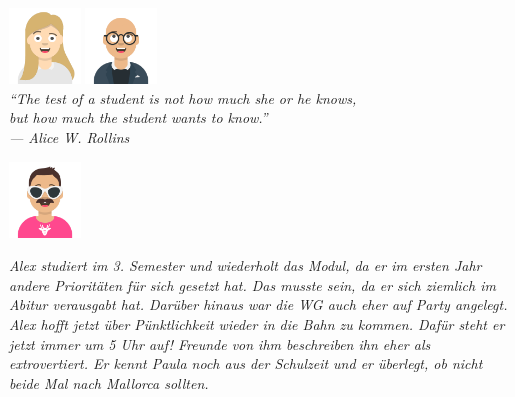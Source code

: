 \documentclass[a4paper, 9pt]{scrartcl}\usepackage[]{graphicx}\usepackage[]{xcolor}
\begin{document}
{\begin{center}
\includegraphics[width = 1.9cm]{avatare/Tina}\hspace{-8mm}
\includegraphics[width = 1.9cm]{avatare/Yuki}\\
\small
\vspace{1.5Ex}
\textit{"`The test of a student is not how much she or he knows,\\ but how much the student wants to know."'\\ --- Alice W. Rollins}
\end{center}}
\maketitle
{}
\thispagestyle{empty}
\clearpage
\begin{minipage}[c]{0.125\textwidth}
\includegraphics[width = 1.9cm]{avatare/Alex}
\end{minipage}
\begin{minipage}[c]{0.875\textwidth}
\textit{Alex studiert im 3. Semester und wiederholt das Modul, da er im ersten Jahr andere Prioritäten für sich gesetzt hat. Das musste sein, da er sich ziemlich im Abitur verausgabt hat. Darüber hinaus war die WG auch eher auf Party angelegt. Alex hofft jetzt über Pünktlichkeit wieder in die Bahn zu kommen. Dafür steht er jetzt immer um 5 Uhr auf! Freunde von ihm beschreiben ihn eher als extrovertiert. Er kennt Paula noch aus der Schulzeit und er überlegt, ob nicht beide Mal nach Mallorca sollten.} 
\end{minipage}\\[2.75Ex]
\end{document}

